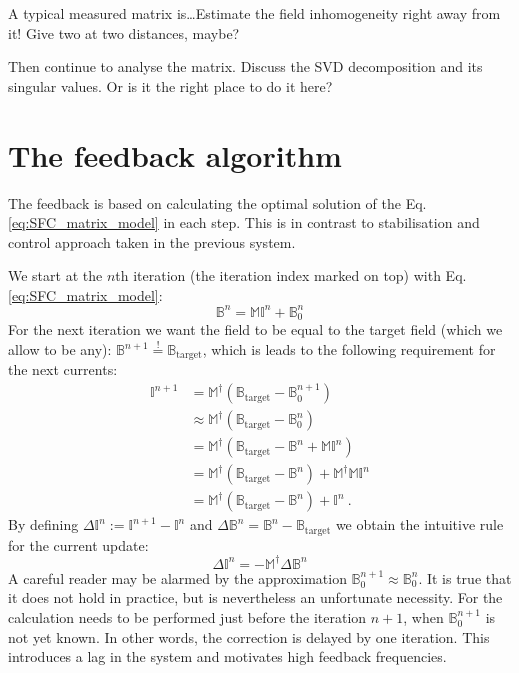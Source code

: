 A typical measured matrix is\ldots Estimate the field inhomogeneity right away from it! Give two at two distances, maybe?

Then continue to analyse the matrix. Discuss the SVD decomposition and its singular values. Or is it the right place to do it here?


\section{The feedback algorithm}
The feedback is based on calculating the optimal solution of the Eq.\,\ref{eq:SFC_matrix_model} in each step. This is in contrast to stabilisation and control approach taken in the previous system.

We start at the $n$th iteration (the iteration index marked on top) with Eq.\,\ref{eq:SFC_matrix_model}:
\begin{equation}
  \mathbb{B}^n = \mathbb{M} \mathbb{I}^n + \mathbb{B}_0^n
\end{equation}
For the next iteration we want the field to be equal to the target field (which we allow to be any): $\mathbb{B}^{n+1} \overset{!}{=} \mathbb{B}_\text{target}$, which is leads to the following requirement for the next currents:
\begin{align}
  \mathbb{I}^{n+1} &=
    \mathbb{M}^\dagger \left( \mathbb{B}_\text{target} - \mathbb{B}_0^{n+1} \right) \nonumber \\
    &\approx \mathbb{M}^\dagger \left( \mathbb{B}_\text{target} - \mathbb{B}_0^{n} \right) \nonumber \\
    &= \mathbb{M}^\dagger \left( \mathbb{B}_\text{target} - \mathbb{B}^n + \mathbb{M} \mathbb{I}^n \right) \nonumber \\
    &= \mathbb{M}^\dagger \left( \mathbb{B}_\text{target} - \mathbb{B}^n \right) + \mathbb{M}^\dagger \mathbb{M} \mathbb{I}^n \nonumber \\
    &= \mathbb{M}^\dagger \left( \mathbb{B}_\text{target} - \mathbb{B}^n \right) + \mathbb{I}^n \ . \label{eq:current_update}
\end{align}
By defining $\Delta\mathbb{I}^n := \mathbb{I}^{n+1} - \mathbb{I}^{n}$ and $\Delta\mathbb{B}^n = \mathbb{B}^n - \mathbb{B}_\text{target}$ we obtain the intuitive rule for the current update:
\begin{equation}
  \Delta\mathbb{I}^n = - \mathbb{M}^\dagger \Delta\mathbb{B}^n
\end{equation}
A careful reader may be alarmed by the approximation $\mathbb{B}_0^{n+1} \approx \mathbb{B}_0^{n}$. It is true that it does not hold in practice, but is nevertheless an unfortunate necessity. For the calculation needs to be performed just before the iteration $n+1$, when $\mathbb{B}_0^{n+1}$ is not yet known. In other words, the correction is delayed by one iteration. This introduces a lag in the system and motivates high feedback frequencies.

